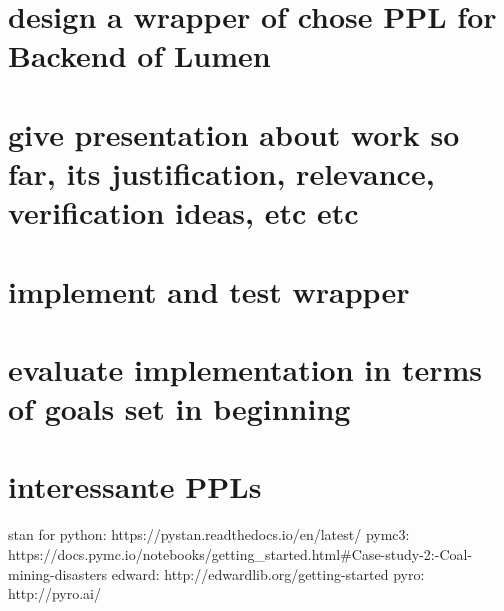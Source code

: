 \documentclass{article}
\begin{document}
\section{design a wrapper of chose PPL for Backend of Lumen}
\section{give presentation about work so far, its justification, relevance, verification ideas, etc etc}
\section{implement and test wrapper}
\section{evaluate implementation in terms of goals set in beginning}

\section{interessante PPLs}

    stan for python: https://pystan.readthedocs.io/en/latest/ \newline
    pymc3: https://docs.pymc.io/notebooks/getting\_started.html\#Case-study-2:-Coal-mining-disasters \newline
    edward: http://edwardlib.org/getting-started \newline
    pyro: http://pyro.ai/
\end{document}

